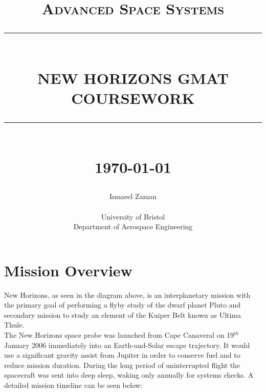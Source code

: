 \documentclass[11pt]{article}
\newcommand{\HRule}[1]{\rule{\linewidth}{#1}}
\begin{document}
\title{ \normalsize \textsc{Advanced Space Systems}
		\\ [2.0cm]
		\HRule{0.5pt} \\
		\LARGE \textbf{\uppercase{New Horizons GMAT Coursework}}
		\HRule{2pt} \\ [0.5cm]
		\normalsize \today \vspace*{5\baselineskip}}

\date{}


\author{
		Ismaeel Zaman  \\ 
		\\
		University of Bristol \\
		Department of Aerospace Engineering }

\maketitle
\thispagestyle{empty}
\newpage
\setcounter{page}{1}




\newpage

\section{Mission Overview}


New Horizons, as seen in the diagram above, is an interplanetary mission with the primary goal of performing a flyby study of the dwarf planet Pluto and secondary mission to study an element of the Kuiper Belt known as Ultima Thule. \\

The New Horizons space probe was launched from Cape Canaveral on 19$^{th}$ January 2006 immediately into an Earth-and-Solar escape trajectory. It would use a significant gravity assist from Jupiter in order to conserve fuel and to reduce mission duration. During the long period of uninterrupted flight the spacecraft was sent into deep sleep, waking only annually for systems checks.
A detailed mission timeline can be seen below:
\end{document}
